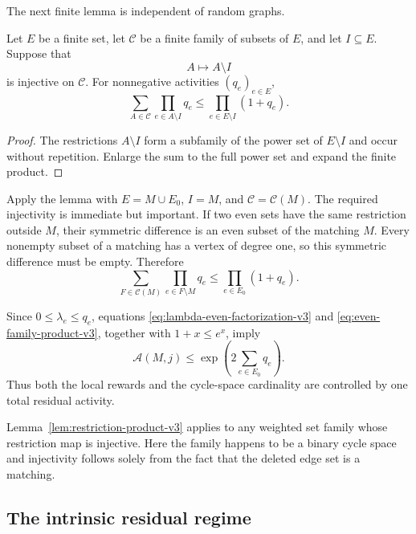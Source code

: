 The next finite lemma is independent of random graphs.

\begin{lemma}
\label{lem:restriction-product-v3}
Let $E$ be a finite set, let $\mathcal C$ be a finite family of subsets of
$E$, and let $I\subseteq E$. Suppose that
\[
  A\longmapsto A\setminus I
\]
is injective on $\mathcal C$. For nonnegative activities $(q_e)_{e\in E}$,
\[
  \sum_{A\in\mathcal C}
    \prod_{e\in A\setminus I}q_e
  \le
  \prod_{e\in E\setminus I}(1+q_e).
\]
\end{lemma}

\begin{proof}
The restrictions $A\setminus I$ form a subfamily of the power set of
$E\setminus I$ and occur without repetition. Enlarge the sum to the full power
set and expand the finite product.
\end{proof}

Apply the lemma with $E=M\cup E_0$, $I=M$, and
$\mathcal C=\mathcal C(M)$. The required injectivity is immediate but
important. If two even sets have the same restriction outside $M$, their
symmetric difference is an even subset of the matching $M$. Every nonempty
subset of a matching has a vertex of degree one, so this symmetric difference
must be empty. Therefore
\begin{equation}
  \sum_{F\in\mathcal C(M)}
    \prod_{e\in F\setminus M}q_e
  \le
  \prod_{e\in E_0}(1+q_e).
  \label{eq:even-family-product-v3}
\end{equation}

Since $0\le\lambda_e\le q_e$, equations
\eqref{eq:lambda-even-factorization-v3} and
\eqref{eq:even-family-product-v3}, together with $1+x\le e^x$, imply
\begin{equation}
  \mathcal A(M,j)
  \le
  \exp\!\left(2\sum_{e\in E_0}q_e\right).
  \label{eq:q-only-attachment-v3}
\end{equation}
Thus both the local rewards and the cycle-space cardinality are controlled by
one total residual activity.

\begin{remark}
Lemma~\ref{lem:restriction-product-v3} applies to any weighted set family whose
restriction map is injective. Here the family happens to be a binary cycle
space and injectivity follows solely from the fact that the deleted edge set is
a matching.
\end{remark}

\subsection{The intrinsic residual regime}

